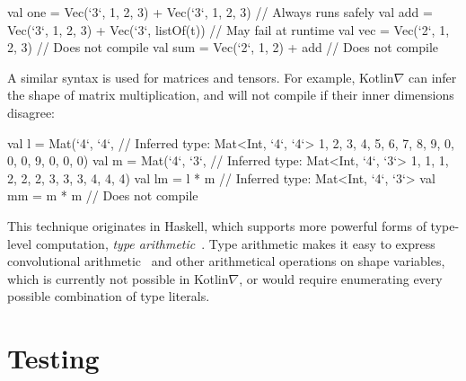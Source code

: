 \documentclass[12pt,initial,twoside,maitrise]{dms}
\numberwithin{equation}{section}
\numberwithin{table}{chapter}
\numberwithin{figure}{chapter}
\begin{document}
%
\begin{mylisting}
val one = Vec(`3`, 1, 2, 3) + Vec(`3`, 1, 2, 3)   // Always runs safely
val add = Vec(`3`, 1, 2, 3) + Vec(`3`, listOf(t)) // May fail at runtime
val vec = Vec(`2`, 1, 2, 3)                       // Does not compile
val sum = Vec(`2`, 1, 2) + add                    // Does not compile
\end{mylisting}
%
A similar syntax is used for matrices and tensors. For example, Kotlin$\nabla$ can infer the shape of matrix multiplication, and will not compile if their inner dimensions disagree:
%
\begin{mylisting}
val l = Mat(`4`, `4`, // Inferred type: Mat<Int, `4`, `4`>
             1, 2, 3, 4,
             5, 6, 7, 8,
             9, 0, 0, 0,
             9, 0, 0, 0)
val m = Mat(`4`, `3`, // Inferred type: Mat<Int, `4`, `3`>
             1, 1, 1,
             2, 2, 2,
             3, 3, 3,
             4, 4, 4)
val lm = l * m // Inferred type: Mat<Int, `4`, `3`>
val mm = m * m // Does not compile
\end{mylisting}
%
This technique originates in Haskell, which supports more powerful forms of type-level computation, \textit{type arithmetic}~\citep{kiselyov2005number}. Type arithmetic makes it easy to express convolutional arithmetic~\citep{dumoulin2016guide} and other arithmetical operations on shape variables, which is currently not possible in Kotlin$\nabla$, or would require enumerating every possible combination of type literals.

\section{Testing}\label{sec:testing}
\end{document}
